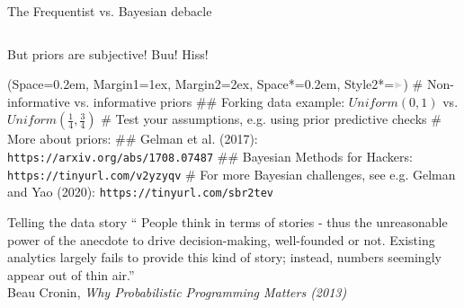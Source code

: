 \documentclass[12pt, aspectratio=149]{beamer}
\newcommand{\listSpace}{0.2em}
\theoremstyle{plain}
\begin{document}
\begin{frame}[fragile]{The Frequentist vs. Bayesian debacle}
\begin{columns}
\begin{column}{0.3\textwidth}
		\end{column}
	\end{columns}
\end{frame}

\begin{frame}[fragile]{But priors are subjective! Buu! Hiss!}
	\begin{easylist}
		\ListProperties(Space=\listSpace, Margin1=1ex, Margin2=2ex, Space*=\listSpace, Style2*=$\color{bggraydark}\blacktriangleright$\space)
		# Non-informative vs. informative priors
		## Forking data example: $Uniform(0, 1)$ vs. $Uniform(\frac{1}{4}, \frac{3}{4})$
		# Test your assumptions, e.g. using prior predictive checks
		# More about priors:
		## Gelman et al. (2017): \footnotesize\texttt{https://arxiv.org/abs/1708.07487}
		## Bayesian Methods for Hackers: \footnotesize\texttt{https://tinyurl.com/v2yzyqv}	
		# For more Bayesian challenges, see e.g. Gelman and Yao (2020): \footnotesize\texttt{https://tinyurl.com/sbr2tev}
	\end{easylist}
\end{frame}

\begin{frame}[fragile]{Telling the data story}
	`` People think in terms of stories - thus the unreasonable power of the anecdote to drive decision-making, well-founded or not. Existing analytics largely fails to provide this kind of story; instead, numbers seemingly appear out of thin air.'' \\
	\flushright Beau Cronin, \textit{Why Probabilistic Programming Matters (2013)}
\end{frame}
\end{document}
